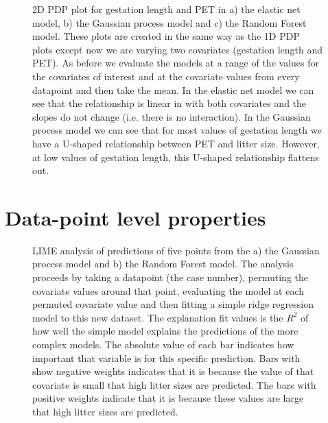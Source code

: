 \documentclass[12pt,]{article}
\begin{document}
\begin{figure}[t!]
  \centering
  \caption{
    2D PDP plot for gestation length and PET in a) the elastic net model, b) the Gaussian process model and c) the Random Forest model.
    These plots are created in the same way as the 1D PDP plots except now we are varying two covariates (gestation length and PET).
    As before we evaluate the models at a range of the values for the covariates of interest and at the covariate values from every datapoint and then take the mean.
    In the elastic net model we can see that the relationship is linear in with both covariates and the slopes do not change (i.e. there is no interaction).
    In the Gaussian process model we can see that for most values of gestation length we have a U-shaped relationship between PET and litter size.
    However, at low values of gestation length, this U-shaped relationship flattens out.
  }
  \label{fig:2d}
\end{figure}



\section{Data-point level properties}\label{data-point-level-properties}

\begin{figure}[t!]
\centering
    
\caption{
LIME analysis of predictions of five points from the a) the Gaussian process model and b) the Random Forest model.
The analysis proceeds by taking a datapoint (the case number), permuting the covariate values around that point, evaluating the model at each permuted covariate value and then fitting a simple ridge regression model to this new dataset.
The explanation fit values is the $R^2$ of how well the simple model explains the predictions of the more complex models.
The absolute value of each bar indicates how important that variable is for this specific prediction.
Bars with show negative weights indicates that it is because the value of that covariate is small that high litter sizes are predicted.
The bars with positive weights indicate that it is because these values are large that high litter sizes are predicted.
\protect\label{fig:limegp}}
\end{figure}
\end{document}
